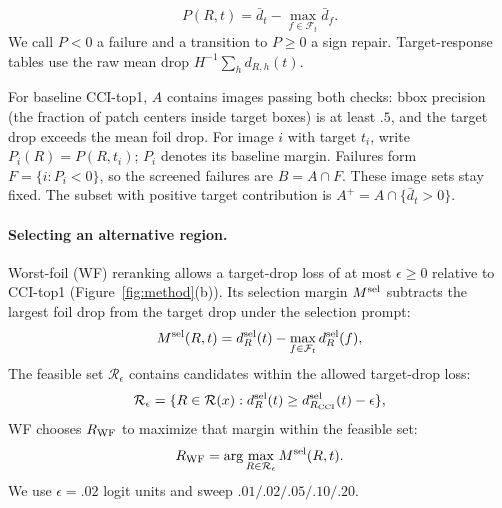 \documentclass[10pt]{article}
\newcommand{\foils}{\mathcal F}
\newcommand{\regions}{\mathcal R}
\begin{document}
\begin{equation}
P(R,t)=\bar d_t-\max_{f\in\foils_t}\bar d_f.
\label{eq:estimands}
\end{equation}
We call $P<0$ a failure and a transition to $P\ge0$ a sign repair.
Target-response tables use the raw mean drop $H^{-1}\sum_h d_{R,h}(t)$.

\noindent\begin{minipage}{\columnwidth}
For baseline CCI-top1, $A$ contains images passing both checks: bbox
precision (the fraction of patch centers inside target boxes) is at least
$.5$, and the target drop exceeds the mean foil drop. For image $i$ with
target $t_i$, write $P_i(R)=P(R,t_i)$; $P_i$ denotes its baseline margin.
Failures form $F=\{i:P_i<0\}$, so the screened failures are $B=A\cap F$.
These image sets stay fixed. The subset with positive target contribution
is $A^+=A\cap\{\bar d_t>0\}$.
\end{minipage}\par

\paragraph{Selecting an alternative region.}
Worst-foil (WF) reranking allows a target-drop loss of at most
$\epsilon\ge0$ relative to CCI-top1 (Figure~\ref{fig:method}(b)).
Its selection margin $M^{\rm sel}$ subtracts the largest foil drop
from the target drop under the selection prompt:
\begin{equation}
M^{\rm sel}(R,t)=d_R^{\rm sel}(t)-\max_{f\in\foils_t}d_R^{\rm sel}(f),
\end{equation}
The feasible set $\regions_\epsilon$ contains candidates within the
allowed target-drop loss:
\begin{equation}
\regions_\epsilon=\{R\in\regions(x):d_R^{\rm sel}(t)\ge d_{R_{\rm CCI}}^{\rm sel}(t)-\epsilon\},
\label{eq:feasible}
\end{equation}
WF chooses $R_{\rm WF}$ to maximize that margin within the feasible set:
\begin{equation}
R_{\rm WF}=\arg\max_{R\in\regions_\epsilon}M^{\rm sel}(R,t).
\label{eq:wf}
\end{equation}
We use $\epsilon=.02$ logit units and sweep $.01/.02/.05/.10/.20$.
\end{document}
